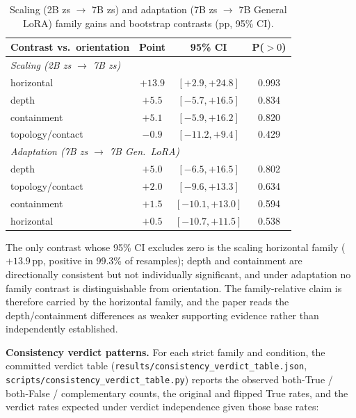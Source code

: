 \begin{table}[h]
\centering
\footnotesize
\caption{Scaling (2B zs $\rightarrow$ 7B zs) and adaptation (7B zs
$\rightarrow$ 7B General LoRA) family gains and bootstrap contrasts
(pp, 95\% CI).}
\label{tab:bootstrap}
\begin{tabular}{lccc}
\toprule
Contrast vs.\ orientation & Point & 95\% CI & P($>0$) \\
\midrule
\multicolumn{4}{l}{\emph{Scaling (2B zs $\rightarrow$ 7B zs)}} \\
\hspace{1em} horizontal & $+13.9$ & $[+2.9, +24.8]$ & 0.993 \\
\hspace{1em} depth & $+5.5$ & $[-5.7, +16.5]$ & 0.834 \\
\hspace{1em} containment & $+5.1$ & $[-5.9, +16.2]$ & 0.820 \\
\hspace{1em} topology/contact & $-0.9$ & $[-11.2, +9.4]$ & 0.429 \\
\multicolumn{4}{l}{\emph{Adaptation (7B zs $\rightarrow$ 7B Gen.\ LoRA)}} \\
\hspace{1em} depth & $+5.0$ & $[-6.5, +16.5]$ & 0.802 \\
\hspace{1em} topology/contact & $+2.0$ & $[-9.6, +13.3]$ & 0.634 \\
\hspace{1em} containment & $+1.5$ & $[-10.1, +13.0]$ & 0.594 \\
\hspace{1em} horizontal & $+0.5$ & $[-10.7, +11.5]$ & 0.538 \\
\bottomrule
\end{tabular}
\end{table}

The only contrast whose 95\% CI excludes zero is the scaling horizontal
family ($+13.9\,\mathrm{pp}$, positive in 99.3\% of resamples); depth and containment
are directionally consistent but not individually significant, and under
adaptation no family contrast is distinguishable from orientation. The
family-relative claim is therefore carried by the horizontal family, and the
paper reads the depth/containment differences as weaker supporting evidence
rather than independently established.

\textbf{Consistency verdict patterns.} For each strict family and condition,
the committed verdict table
(\texttt{results/consistency\_verdict\_table.\allowbreak{}json},
\texttt{scripts/consistency\_verdict\_table.py}) reports the observed
both-True / both-False / complementary counts, the original and flipped True
rates, and the verdict rates expected under verdict independence given those
base rates:

